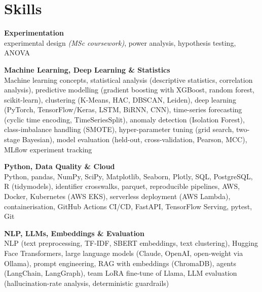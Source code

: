 \documentclass[a4paper,11pt]{article}
\newcommand{\skillgroup}[2]{{\color{headernavy}\textbf{#1}}\\ #2\par\vspace{3pt}}
\begin{document}
\section{Skills}
\skillgroup{Experimentation}{experimental design \textit{(MSc coursework)}, power analysis, hypothesis testing, ANOVA}
\skillgroup{Machine Learning, Deep Learning \& Statistics}{Machine learning concepts, statistical analysis (descriptive statistics, correlation analysis), predictive modelling (gradient boosting with XGBoost, random forest, scikit-learn), clustering (K-Means, HAC, DBSCAN, Leiden), deep learning (PyTorch, TensorFlow/Keras, LSTM, BiRNN, CNN), time-series forecasting (cyclic time encoding, TimeSeriesSplit), anomaly detection (Isolation Forest), class-imbalance handling (SMOTE), hyper-parameter tuning (grid search, two-stage Bayesian), model evaluation (held-out, cross-validation, Pearson, MCC), MLflow experiment tracking}
\skillgroup{Python, Data Quality \& Cloud}{Python, pandas, NumPy, SciPy, Matplotlib, Seaborn, Plotly, SQL, PostgreSQL, R (tidymodels), identifier crosswalks, parquet, reproducible pipelines, AWS, Docker, Kubernetes (AWS EKS), serverless deployment (AWS Lambda), containerisation, GitHub Actions CI/CD, FastAPI, TensorFlow Serving, pytest, Git}
\skillgroup{NLP, LLMs, Embeddings \& Evaluation}{NLP (text preprocessing, TF-IDF, SBERT embeddings, text clustering), Hugging Face Transformers, large language models (Claude, OpenAI, open-weight via Ollama), prompt engineering, RAG with embeddings (ChromaDB), agents (LangChain, LangGraph), team LoRA fine-tune of Llama, LLM evaluation (hallucination-rate analysis, deterministic guardrails)}
\end{document}
